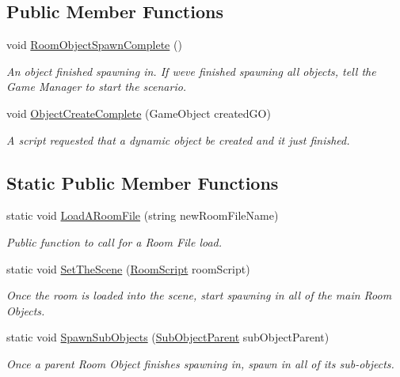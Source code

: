 \subsection*{Public Member Functions}
\begin{DoxyCompactItemize}
\item 
void \hyperlink{class_room_generator_ae830ed790aac77b46d07122adfeabf8b}{Room\+Object\+Spawn\+Complete} ()
\begin{DoxyCompactList}\small\item\em An object finished spawning in. If we\textquotesingle{}ve finished spawning all objects, tell the Game Manager to start the scenario.\end{DoxyCompactList}\item 
void \hyperlink{class_room_generator_ae121bd18747826525bfb7a1373fb8815}{Object\+Create\+Complete} (Game\+Object created\+GO)
\begin{DoxyCompactList}\small\item\em A script requested that a dynamic object be created and it just finished.\end{DoxyCompactList}\end{DoxyCompactItemize}
\subsection*{Static Public Member Functions}
\begin{DoxyCompactItemize}
\item 
static void \hyperlink{class_room_generator_a33a166564d1f35811cef377d7d54542d}{Load\+A\+Room\+File} (string new\+Room\+File\+Name)
\begin{DoxyCompactList}\small\item\em Public function to call for a Room File load.\end{DoxyCompactList}\item 
static void \hyperlink{class_room_generator_afd47621ed5bd8fa1188597457e058b4f}{Set\+The\+Scene} (\hyperlink{class_room_script}{Room\+Script} room\+Script)
\begin{DoxyCompactList}\small\item\em Once the room is loaded into the scene, start spawning in all of the main Room Objects.\end{DoxyCompactList}\item 
static void \hyperlink{class_room_generator_ace5a03c289af51e9ef00640179f3eb53}{Spawn\+Sub\+Objects} (\hyperlink{class_sub_object_parent}{Sub\+Object\+Parent} sub\+Object\+Parent)
\begin{DoxyCompactList}\small\item\em Once a parent Room Object finishes spawning in, spawn in all of its sub-\/objects.\end{DoxyCompactList}\end{DoxyCompactItemize}
